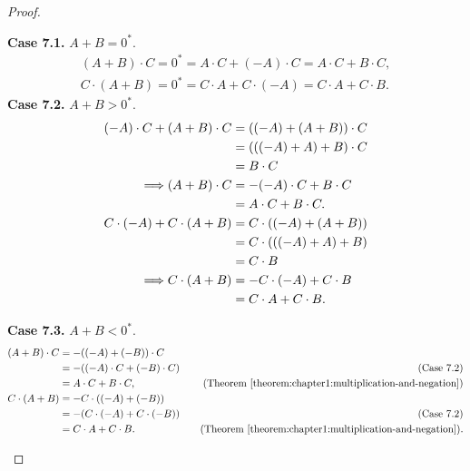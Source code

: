 \begin{proof}
\begin{enumerate}[label={(F\arabic*)}, start=5]
              \textbf{Case 7.1.} $A + B = {0}^{*}$.
              \[
                  \begin{split}
                      (A + B)\cdot C = {0}^{*} = A\cdot C + (-A)\cdot C = A\cdot C + B\cdot C, \\
                      C\cdot (A + B) = {0}^{*} = C\cdot A + C\cdot (-A) = C\cdot A + C\cdot B.
                  \end{split}
              \]
              \textbf{Case 7.2.} $A + B > {0}^{*}$.
              \begin{align*}
                  (-A)\cdot C + (A + B)\cdot C   & = ((-A) + (A + B))\cdot C \\
                                                 & = (((-A) + A) + B)\cdot C \\
                                                 & = B\cdot C                \\
                  \Longrightarrow (A + B)\cdot C & = -(-A)\cdot C + B\cdot C \\
                                                 & = A\cdot C + B\cdot C.    \\
                  \bigskip
                  C\cdot (-A) + C\cdot (A + B)   & = C\cdot ((-A) + (A + B)) \\
                                                 & = C\cdot (((-A) + A) + B) \\
                                                 & = C\cdot B                \\
                  \Longrightarrow C\cdot (A + B) & = -C\cdot (-A) + C\cdot B \\
                                                 & = C\cdot A + C\cdot B.
              \end{align*}

              \textbf{Case 7.3.} $A + B < {0}^{*}$.
              \begin{align*}
                  (A + B)\cdot C & = -((-A) + (-B))\cdot C                                                                                    \\
                                 & = -((-A)\cdot C + (-B)\cdot C) & \quad\text{(Case 7.2)}                                                    \\
                                 & = A\cdot C + B\cdot C,         & \quad\text{(Theorem~\ref{theorem:chapter1:multiplication-and-negation})}  \\
                  C\cdot (A + B) & = -C\cdot ((-A) + (-B))                                                                                    \\
                                 & = -(C\cdot (-A) + C\cdot (-B)) & \quad\text{(Case 7.2)}                                                    \\
                                 & = C\cdot A + C\cdot B.         & \quad\text{(Theorem~\ref{theorem:chapter1:multiplication-and-negation})}.
              \end{align*}


\end{enumerate}
\end{proof}
